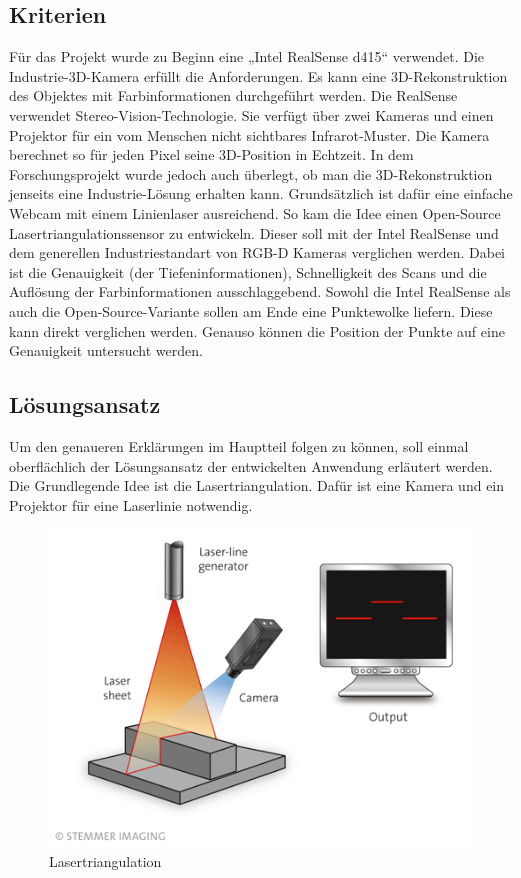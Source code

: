 	\subsection{Kriterien}
	Für das Projekt wurde zu Beginn eine „Intel RealSense d415“ verwendet. Die Industrie-3D-Kamera erfüllt die Anforderungen. Es kann eine 3D-Rekonstruktion des Objektes mit Farbinformationen durchgeführt werden. Die RealSense verwendet Stereo-Vision-Technologie. Sie verfügt über zwei Kameras und einen Projektor für ein vom Menschen nicht sichtbares Infrarot-Muster. Die Kamera berechnet so für jeden Pixel seine 3D-Position in Echtzeit. In dem Forschungsprojekt wurde jedoch auch überlegt, ob man die 3D-Rekonstruktion jenseits eine Industrie-Lösung erhalten kann. Grundsätzlich ist dafür eine einfache Webcam mit einem Linienlaser ausreichend. So kam die Idee einen Open-Source Lasertriangulationssensor zu entwickeln.
	Dieser soll mit der Intel RealSense und dem generellen Industriestandart von RGB-D Kameras verglichen werden. Dabei ist die Genauigkeit (der Tiefeninformationen), Schnelligkeit des Scans und die Auflösung der Farbinformationen ausschlaggebend. Sowohl die Intel RealSense als auch die Open-Source-Variante sollen am Ende eine Punktewolke liefern. Diese kann direkt verglichen werden. Genauso können die Position der Punkte auf eine Genauigkeit untersucht werden. 
	
	\newpage
	
	\subsection{Lösungsansatz}
	Um den genaueren Erklärungen im Hauptteil folgen zu können, soll einmal oberflächlich der Lösungsansatz der entwickelten Anwendung erläutert werden. Die Grundlegende Idee ist die Lasertriangulation. Dafür ist eine Kamera und ein Projektor für eine Laserlinie notwendig.
	\begin{figure}[h]
		\centering
		\includegraphics[width=0.7\linewidth]{img/grundlagen/lasertriangulation_1}
		\caption{Lasertriangulation}
		\label{fig:lasertriangulation}
	\end{figure}

